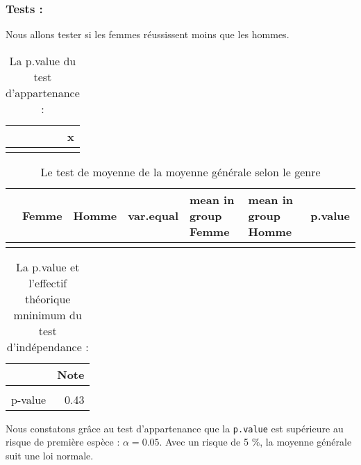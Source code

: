 \documentclass[
  11pt,
  french,
]{article}
\begin{document}
\hypertarget{tests-2}{%
\subsubsection{Tests :}\label{tests-2}}

Nous allons tester si les femmes réussissent moins que les hommes.

\begin{table}[!h]

\caption{\label{tab:tests3_non}La p.value du test d'appartenance :}
\centering
\begin{tabular}[t]{lr}
\toprule
  & x\\
\midrule
\cellcolor{gray!6}{Note.p.value} & \cellcolor{gray!6}{0.55}\\
\bottomrule
\end{tabular}
\end{table}

\begin{table}[!h]

\caption{\label{tab:tests3_non}Le test de moyenne de la moyenne générale selon le genre}
\centering
\begin{tabular}[t]{lllllll}
\toprule
  & Femme & Homme & var.equal & mean in group Femme & mean in group Homme & p.value\\
\midrule
\cellcolor{gray!6}{Note} & \cellcolor{gray!6}{27} & \cellcolor{gray!6}{25} & \cellcolor{gray!6}{Oui} & \cellcolor{gray!6}{10.62} & \cellcolor{gray!6}{10.74} & \cellcolor{gray!6}{0.87}\\
\bottomrule
\end{tabular}
\end{table}

\begin{table}[!h]

\caption{\label{tab:tests3_non}La p.value et l'effectif théorique mninimum du test d'indépendance :}
\centering
\begin{tabular}[t]{lr}
\toprule
  & Note\\
\midrule
\cellcolor{gray!6}{Eff\_théorique\_min} & \cellcolor{gray!6}{0.48}\\
p-value & 0.43\\
\bottomrule
\end{tabular}
\end{table}

Nous constatons grâce au test d'appartenance que la \texttt{p.value} est
supérieure au risque de première espèce : \(\alpha = 0.05\). Avec un
risque de 5 \%, la moyenne générale suit une loi normale.
\end{document}
